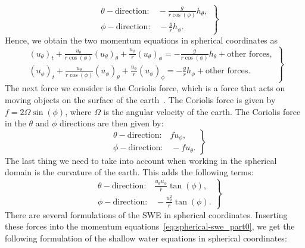 \begin{equation*}
    \left.
    \begin{aligned}
        &\theta-\text{direction:} \quad -\frac{g}{r \cos(\phi)} h_{\theta},\\
        &\phi-\text{direction:} \quad -\frac{g}{r} h_{\phi}.
    \end{aligned}
    \right\}
\end{equation*}
Hence, we obtain the two momentum equations in spherical coordinates as
\begin{equation}\label{eq:spherical-swe_part0} 
    \left.
    \begin{aligned}
         {(u_\theta)}_t + \frac{u_\theta}{r \cos(\phi)} {(u_\theta)}_\theta + \frac{u_\phi}{r} {(u_\theta)}_\phi = -\frac{g}{r \cos(\phi)} h_{\theta} + \text{other forces}, \\
        {( u_\phi)}_t + \frac{u_\theta}{r \cos(\phi)} {(u_\phi)}_\theta   + \frac{u_\phi}{r} {(u_\phi)}_\phi = -\frac{g}{r} h_{\phi} + \text{other forces}.
    \end{aligned}
    \right\}
\end{equation}
The next force we consider is the Coriolis force, which is a force that acts on moving objects on the surface of the earth~\cite{Coriolis}.
The Coriolis force is given by $f = 2 \Omega \sin(\phi)$, where $\Omega$ is the angular velocity of the earth.
The Coriolis force in the $\theta$ and $\phi$ directions are then given by:
\begin{equation*}
    \left.
    \begin{aligned}
        &\theta-\text{direction:} \quad f u_\phi,\\
        &\phi-\text{direction:} \quad -f u_\theta.
    \end{aligned}
    \right\}
\end{equation*}
The last thing we need to take into account when working in the spherical domain is the curvature of the earth.
This adds the following terms:
\begin{equation*}
    \left.
    \begin{aligned}
        &\theta-\text{direction:} \quad \frac{u_\theta u_\phi}{r} \tan(\phi),\\
        &\phi-\text{direction:} \quad -\frac{u_\theta^2}{r} \tan(\phi).
    \end{aligned}
    \right\}
\end{equation*}
There are several formulations of the SWE in spherical coordinates.
Inserting these forces into the momentum equations~\eqref{eq:spherical-swe_part0}, we get the following formulation of the shallow water equations in spherical coordinates:
